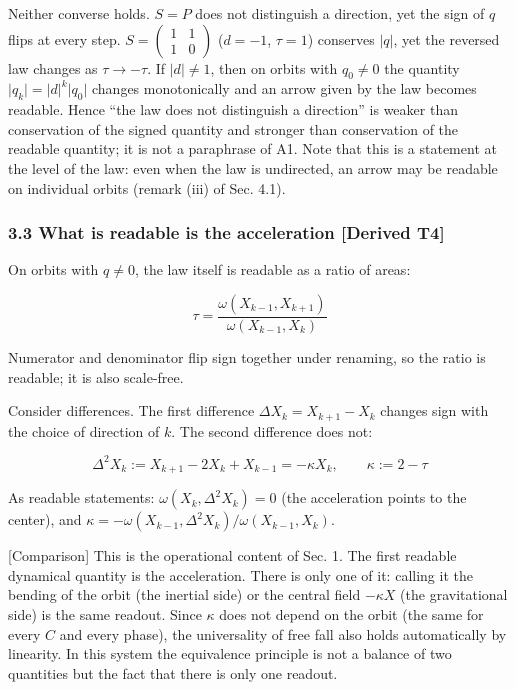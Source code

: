 \documentclass[
  a4paper,
]{article}
\begin{document}
Neither converse holds. \(S=P\) does not distinguish a direction, yet
the sign of \(q\) flips at every step.
\(S=\begin{pmatrix}1&1\\1&0\end{pmatrix}\) (\(d=-1\), \(\tau=1\))
conserves \(\lvert q\rvert\), yet the reversed law changes as
\(\tau\to-\tau\). If \(\lvert d\rvert\neq1\), then on orbits with
\(q_0\neq0\) the quantity
\(\lvert q_k\rvert=\lvert d\rvert^k\lvert q_0\rvert\) changes
monotonically and an arrow given by the law becomes readable. Hence
``the law does not distinguish a direction'' is weaker than conservation
of the signed quantity and stronger than conservation of the readable
quantity; it is not a paraphrase of A1. Note that this is a statement at
the level of the law: even when the law is undirected, an arrow may be
readable on individual orbits (remark (iii) of Sec. 4.1).

\subsubsection{3.3 What is readable is the acceleration {[}Derived
T4{]}}\label{what-is-readable-is-the-acceleration-derived-t4}

On orbits with \(q\neq0\), the law itself is readable as a ratio of
areas:

\[
\tau=\frac{\omega(X_{k-1},X_{k+1})}{\omega(X_{k-1},X_k)}
\]

Numerator and denominator flip sign together under renaming, so the
ratio is readable; it is also scale-free.

Consider differences. The first difference \(\Delta X_k=X_{k+1}-X_k\)
changes sign with the choice of direction of \(k\). The second
difference does not:

\[
\boxed{\;\Delta^2X_k:=X_{k+1}-2X_k+X_{k-1}=-\kappa X_k,\qquad\kappa:=2-\tau\;}
\]

As readable statements: \(\omega(X_k,\Delta^2X_k)=0\) (the acceleration
points to the center), and
\(\kappa=-\omega(X_{k-1},\Delta^2X_k)/\omega(X_{k-1},X_k)\).

{[}Comparison{]} This is the operational content of Sec. 1. The first
readable dynamical quantity is the acceleration. There is only one of
it: calling it the bending of the orbit (the inertial side) or the
central field \(-\kappa X\) (the gravitational side) is the same
readout. Since \(\kappa\) does not depend on the orbit (the same for
every \(C\) and every phase), the universality of free fall also holds
automatically by linearity. In this system the equivalence principle is
not a balance of two quantities but the fact that there is only one
readout.
\end{document}
